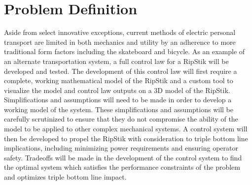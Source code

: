 \documentclass[12pt,letterpaper]{article}
\begin{document}
	
\section{Problem Definition}

Aside from select innovative exceptions, current methods of electric personal transport are limited in both mechanics and utility by an adherence to more traditional form factors including the skateboard and bicycle. 
As an example of an alternate transportation system, a full control law for a RipStik will be developed and tested. 
The development of this control law will first require a complete, working mathematical model of the RipStik and a custom tool to visualize the model and control law outputs on a 3D model of the RipStik. 
Simplifications and assumptions will need to be made in order to develop a working model of the system. 
These simplifications and assumptions will be carefully scrutinized to ensure that they do not compromise the ability of the model to be applied to other complex mechanical systems. 
A control system will then be developed to propel the RipStik with consideration to triple bottom line implications, including minimizing power requirements and ensuring operator safety. 
Tradeoffs will be made in the development of the control system to find the optimal system which satisfies the performance constraints of the problem and optimizes triple bottom line impact. 

\newpage
{}

\end{document}
